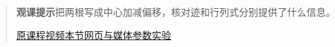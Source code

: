 \begin{quote}\small\textbf{观课提示}\quad 把两根写成中心加减偏移，核对迹和行列式分别提供了什么信息。

\href{https://www.youtube.com/watch?v=e50Bj7jn9IQ}{原课程视频}\quad\href{https://vitael04213.github.io/3blue1brown-notes/lessons/quick-eigen.html}{本节网页与媒体}\quad\href{https://vitael04213.github.io/3blue1brown-notes/lab.html\#eigen}{参数实验}
\end{quote}
